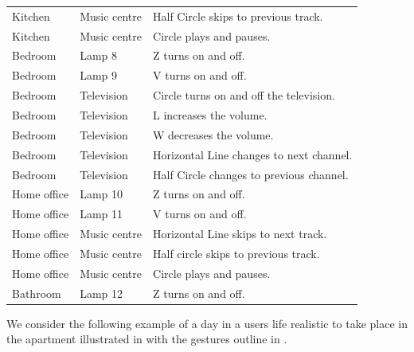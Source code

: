 \begin{table}[]
\begin{tabular}{lll}
Kitchen                    & Music centre                        & Half Circle skips to previous track.     \\
Kitchen                    & Music centre                        & Circle plays and pauses.                 \\
Bedroom                    & Lamp 8                              & Z turns on and off.                      \\
Bedroom                    & Lamp 9                              & V turns on and off.                      \\
Bedroom                    & Television                          & Circle turns on and off the television.  \\
Bedroom                    & Television                          & L increases the volume.                  \\
Bedroom                    & Television                          & W decreases the volume.                  \\
Bedroom                    & Television                          & Horizontal Line changes to next channel. \\
Bedroom                    & Television                          & Half Circle changes to previous channel. \\
Home office                & Lamp 10                             & Z turns on and off.                      \\
Home office                & Lamp 11                             & V turns on and off.                      \\
Home office                & Music centre                        & Horizontal Line skips to next track.     \\
Home office                & Music centre                        & Half circle skips to previous track.     \\
Home office                & Music centre                        & Circle plays and pauses.                 \\
Bathroom                   & Lamp 12                             & Z turns on and off.                     
\end{tabular}
\end{table}

We consider the following example of a day in a users life realistic to take place in the apartment illustrated in  with the gestures outline in .

